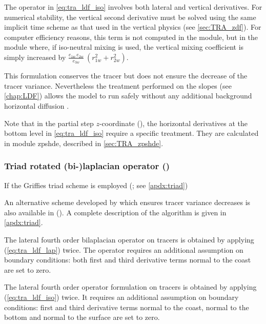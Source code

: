 \documentclass[../tex_main/NEMO_manual]{subfiles}
\begin{document}
The operator in \autoref{eq:tra_ldf_iso} involves both lateral and vertical derivatives.
For numerical stability, the vertical second derivative must be solved using the same implicit time scheme as that
used in the vertical physics (see \autoref{sec:TRA_zdf}).
For computer efficiency reasons, this term is not computed in the  module,
but in the  module where, if iso-neutral mixing is used,
the vertical mixing coefficient is simply increased by
$\frac{e_{1w}\,e_{2w} }{e_{3w} }\ \left( {r_{1w} ^2+r_{2w} ^2} \right)$. 

This formulation conserves the tracer but does not ensure the decrease of the tracer variance.
Nevertheless the treatment performed on the slopes (see \autoref{chap:LDF}) allows the model to run safely without
any additional background horizontal diffusion \citep{Guilyardi_al_CD01}. 

Note that in the partial step $z$-coordinate (),
the horizontal derivatives at the bottom level in \autoref{eq:tra_ldf_iso} require a specific treatment.
They are calculated in module zpshde, described in \autoref{sec:TRA_zpshde}.

\subsubsection{Triad rotated (bi-)laplacian operator (\protect{})}
\label{subsec:TRA_ldf_triad}

If the Griffies triad scheme is employed (; see \autoref{apdx:triad})

An alternative scheme developed by \cite{Griffies_al_JPO98} which ensures tracer variance decreases
is also available in \NEMO ().
A complete description of the algorithm is given in \autoref{apdx:triad}.

The lateral fourth order bilaplacian operator on tracers is obtained by applying (\autoref{eq:tra_ldf_lap}) twice.
The operator requires an additional assumption on boundary conditions:
both first and third derivative terms normal to the coast are set to zero.

The lateral fourth order operator formulation on tracers is obtained by applying (\autoref{eq:tra_ldf_iso}) twice.
It requires an additional assumption on boundary conditions:
first and third derivative terms normal to the coast,
normal to the bottom and normal to the surface are set to zero. 
\end{document}
